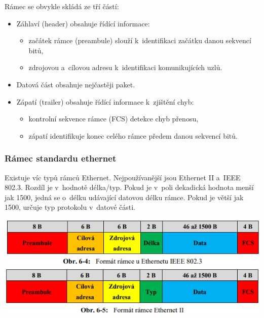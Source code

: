 Rámec se obvykle skládá ze tří částí:
\begin{itemize}[noitemsep]
    \item Záhlaví (header) obsahuje řídící informace:
    \begin{itemize}[noitemsep]
        \item začátek rámce (preambule) slouží k~identifikaci začátku danou sekvencí bitů,
        \item zdrojovou a~cílovou adresu k~identifikaci komunikujících uzlů.
    \end{itemize}
    \item Datová část obsahuje nejčastěji paket.
    \item Zápatí (trailer) obsahuje řídící informace k~zjištění chyb:
    \begin{itemize}[noitemsep]
        \item kontrolní sekvence rámce (FCS) detekce chyb přenosu,
        \item zápatí identifikuje konec celého rámce předem danou sekvencí bitů.
    \end{itemize}
\end{itemize}

\subsubsection{Rámec standardu ethernet}

Existuje víc typů rámců Ethernet. Nejpoužívanější jsou Ethernet II a~IEEE 802.3. Rozdíl je v~hodnotě délka/typ. Pokud je v~poli dekadická hodnota menší jak 1500, jedná se o~délku udávající datovou délku rámce. Pokud je větší jak 1500, určuje typ protokolu v~datové části.

\begin{center}
    \includegraphics[scale= 0.53]{images/-023.png}
    \includegraphics[scale= 0.53]{images/-024.png}
\end{center}

